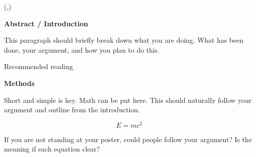 \documentclass[dark]{cgem-poster}
\begin{document}
  \begin{textblock*}{\PosterColumnOneTextWidth{}}(\PosterColumnOneTextLeft{},\PosterColumnOneTextTop{})
    \begin{minipage}[t][\PosterColumnOneTextHeight{}][t]{\PosterColumnOneTextWidth{}}
      \vspace{5mm}
      \begin{center}
        \large
        \textbf{Abstract / Introduction}
      \end{center}

      \vspace{5mm}
      \small
      This paragraph should briefly break down what you are doing. %
      What has been done, your argument, and how you plan to do this.
      
      \vspace{7mm}
      Recommended reading \cite{Landes1958}

      \vspace{8cm}
      \begin{center}
        \large
        \textbf{Methods}
      \end{center}

      \vspace{5mm}
      \small
      Short and simple is key. Math can be put here. %
      This should naturally follow your argument and outline from the introduction.

      \vspace{-2cm}
      \large
      \begin{equation*}
        \mathit{E = m c^\mathrm{2}}
      \end{equation*}

      \vspace{1cm}
      \small
      If you are not standing at your poster, could people follow your argument? %
      Is the meaning if each equation clear?

    \end{minipage}
  \end{textblock*}

  \newcommand{\PosterColumnTwoTextLeft}{\dimexpr (\PosterColumnTwoLeft + \PosterTextMarginSize)\relax}
  \newcommand{\PosterColumnTwoTextWidth}{\dimexpr (\PosterColumnTwoWidth - 2\PosterTextMarginSize)\relax}
  \newcommand{\PosterColumnTwoTextTop}{\dimexpr (\PosterColumnTwoTop + \PosterTextMarginSize)\relax}
  \newcommand{\PosterColumnTwoTextHeight}{\dimexpr (\PosterColumnTwoHeight - 2\PosterTextMarginSize)\relax}
\end{document}
